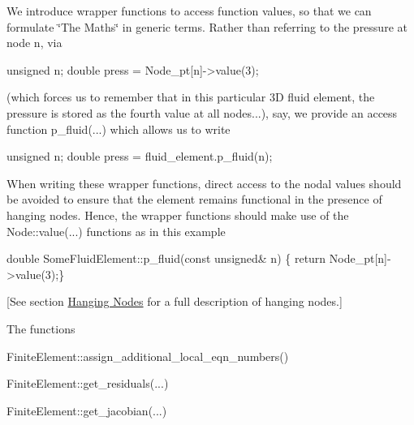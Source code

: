  We introduce wrapper functions to access function values, so that we can formulate \char`\"{}\+The Maths\char`\"{} in generic terms. Rather than referring to the pressure at node {\ttfamily n}, via 
\begin{DoxyCode}
\textcolor{keywordtype}{unsigned} n;
\textcolor{keywordtype}{double} press = Node\_pt[n]->value(3);
\end{DoxyCode}
 (which forces us to remember that in this particular 3D fluid element, the pressure is stored as the fourth value at all nodes...), say, we provide an access function {\ttfamily p\+\_\+fluid}(...) which allows us to write 
\begin{DoxyCode}
\textcolor{keywordtype}{unsigned} n;
\textcolor{keywordtype}{double} press = fluid\_element.p\_fluid(n);
\end{DoxyCode}
 When writing these wrapper functions, direct access to the nodal values should be avoided to ensure that the element remains functional in the presence of hanging nodes. Hence, the wrapper functions should make use of the {\ttfamily Node\+::value}(...) functions as in this example 
\begin{DoxyCode}
\textcolor{keywordtype}{double} SomeFluidElement::p\_fluid(\textcolor{keyword}{const} \textcolor{keywordtype}{unsigned}& n)
 \{ \textcolor{keywordflow}{return} Node\_pt[n]->value(3);\}
\end{DoxyCode}
 \mbox{[}See section \hyperlink{index_Hanging_Nodes}{Hanging Nodes} for a full description of hanging nodes.\mbox{]}

The functions 
\begin{DoxyCode}
FiniteElement::assign\_additional\_local\_eqn\_numbers()  
\end{DoxyCode}
 
\begin{DoxyCode}
FiniteElement::get\_residuals(...) 
\end{DoxyCode}
 
\begin{DoxyCode}
FiniteElement::get\_jacobian(...) 
\end{DoxyCode}


